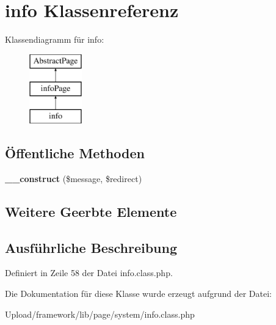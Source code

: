 \hypertarget{classinfo}{}\section{info Klassenreferenz}
\label{classinfo}
Klassendiagramm für info\+:\begin{figure}[H]
\begin{center}
\leavevmode
\includegraphics[height=3.000000cm]{classinfo}
\end{center}
\end{figure}
\subsection*{Öffentliche Methoden}
\begin{DoxyCompactItemize}
\item 
\mbox{\label{classinfo_a34a0f1ee4c26c70e2e53573b6db0ef2d}} 
{\bfseries \+\_\+\+\_\+construct} (\$message, \$redirect)
\end{DoxyCompactItemize}
\subsection*{Weitere Geerbte Elemente}


\subsection{Ausführliche Beschreibung}


Definiert in Zeile 58 der Datei info.\+class.\+php.



Die Dokumentation für diese Klasse wurde erzeugt aufgrund der Datei\+:\begin{DoxyCompactItemize}
\item 
Upload/framework/lib/page/system/info.\+class.\+php\end{DoxyCompactItemize}
